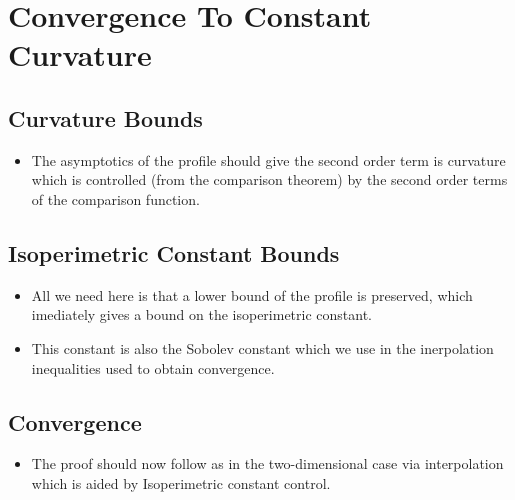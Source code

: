 \documentclass{amsart}
\begin{document}
\section{Convergence To Constant Curvature}

\subsection{Curvature Bounds}

\begin{itemize}
\item The asymptotics of the profile should give the second order term is curvature which is controlled (from the comparison theorem) by the second order terms of the comparison function.
\end{itemize}

\subsection{Isoperimetric Constant Bounds}

\begin{itemize}
\item All we need here is that a lower bound of the profile is preserved, which imediately gives a bound on the isoperimetric constant.
\item This constant is also the Sobolev constant which we use in the inerpolation inequalities used to obtain convergence.
\end{itemize}


\subsection{Convergence}

\begin{itemize}
\item The proof should now follow as in the two-dimensional case via interpolation which is aided by Isoperimetric constant control.
\end{itemize}

\subsection{}
\end{document}
